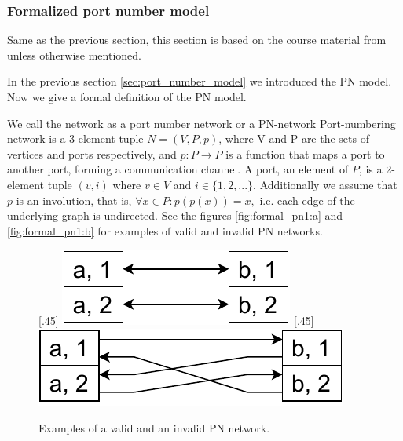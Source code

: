 \subsubsection{Formalized port number model}
Same as the previous section, this section is based on the course material from \cite{HirvonenSuomelaDistAlg2020} unless otherwise mentioned.

In the previous section \ref{sec:port_number_model} we introduced the PN model.
Now we give a formal definition of the PN model.

We call the network as a port number network or a PN-network
Port-numbering network is a 3-element tuple $N = (V, P, p)$, where V and P are the sets of vertices and ports respectively, and $p: P \rightarrow P$ is a function that maps a port to another port, forming a communication channel.
A port, an element of $P$, is a 2-element tuple $(v, i)$ where $v \in V$ and $i \in \{1, 2, ...\}$.
Additionally we assume that $p$ is an involution, that is, $\forall x \in P : p(p(x)) = x, $ i.e. each edge of the underlying graph is undirected.
See the figures \ref{fig:formal_pn1:a} and \ref{fig:formal_pn1:b} for examples of valid and invalid PN networks.

\begin{figure}[h]
    [.45\linewidth] {
    \centering
    \includegraphics[scale=0.6]{diagrams/formalizing_pn_network_diagram1.pdf}
  }
  \hfill
    [.45\linewidth] {
    \centering
    \includegraphics[scale=0.6]{diagrams/formalizing_pn_network_diagram2.pdf}
  }
  \caption{Examples of a valid and an invalid PN network.}
  \label{fig:formal_pn1}
\end{figure}


